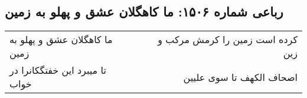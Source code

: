 \begin{center}
\section*{رباعی شماره ۱۵۰۶: ما کاهگلان عشق و پهلو به زمین}
\label{sec:1506}
\begin{longtable}{l p{0.5cm} r}
ما کاهگلان عشق و پهلو به زمین
&&
کرده است زمین را کرمش مرکب و زین
\\
تا میبرد این خفتگکانرا در خواب
&&
اصحاف الکهف تا سوی علیین
\\
\end{longtable}
\end{center}

